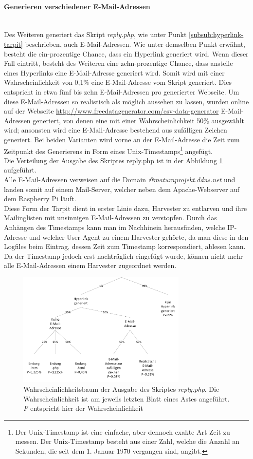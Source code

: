 \paragraph{Generieren verschiedener E-Mail-Adressen}\mbox{}\\
Des Weiteren generiert das Skript \emph{reply.php}, wie unter Punkt \ref{subsub:hyperlink-tarpit} beschrieben, auch E-Mail-Adressen. Wie unter demselben Punkt erwähnt, besteht die ein-prozentige Chance, dass ein Hyperlink generiert wird. Wenn dieser Fall eintritt, besteht des Weiteren eine zehn-prozentige Chance, dass anstelle eines Hyperlinks eine E-Mail-Adresse generiert wird. Somit wird mit einer Wahrscheinlichkeit von 0,1\% eine E-Mail-Adresse vom Skript generiert. Dies entspricht in etwa fünf bis zehn E-Mail-Adressen pro generierter Webseite. Um diese E-Mail-Adressen so realistisch als möglich aussehen zu lassen, wurden online auf der Webseite \url{http://www.freedatagenerator.com/csv-data-generator} E-Mail-Adressen generiert, von denen eine mit einer Wahrscheinlichkeit 50\% ausgewählt wird; ansonsten wird eine E-Mail-Adresse bestehend aus zufälligen Zeichen generiert. Bei beiden Varianten wird vorne an der E-Mail-Adresse die Zeit zum Zeitpunkt des Generierens in Form eines Unix-Timestamps\footnote{Der Unix-Timestamp ist eine einfache, aber dennoch exakte Art Zeit zu messen. Der Unix-Timestamp besteht aus einer Zahl, welche die Anzahl an Sekunden, die seit dem 1. Januar 1970 vergangen sind, angibt.} angefügt.\\
Die Verteilung der Ausgabe des Skriptes reply.php ist in der Abbildung \ref{fig:wahrbaum} aufgeführt.\\
Alle E-Mail-Adressen verweisen auf die Domain \emph{@maturaprojekt.ddns.net} und landen somit auf einem Mail-Server, welcher neben dem Apache-Webserver auf dem Raspberry Pi läuft.\\
Diese Form der Tarpit dient in erster Linie dazu, Harvester zu entlarven und ihre Mailinglisten mit unsinnigen E-Mail-Adressen zu verstopfen. Durch das Anhängen des Timestamps kann man im Nachhinein herausfinden, welche IP-Adresse und welcher User-Agent zu einem Harvester gehörte, da man diese in den Logfiles beim Eintrag, dessen Zeit zum Timestamp korrespondiert, ablesen kann. Da der Timestamp jedoch erst nachträglich eingefügt wurde, können nicht mehr alle E-Mail-Adressen einem Harvester zugeordnet werden.
\begin{figure}[H]
	\centering
	\includegraphics[width=8.45cm]{img/Wahrscheinlichkeitsbaum.png}
	\caption{Wahrscheinlichkeitsbaum der Ausgabe des Skriptes \emph{reply.php}. Die Wahrscheinlichkeit ist am jeweils letzten Blatt eines Astes angeführt. \emph{P} entspricht hier der Wahrscheinlichkeit}
	\label{fig:wahrbaum}
\end{figure}
%
\label{subsub:harverster-tarpit}
